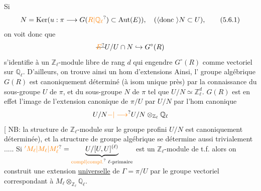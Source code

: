 Si
\[
N=\operatorname{Ker}(u:\pi\longrightarrow G(\unsure{R|\mathbb Q_\ell})\subset\operatorname{Aut}(E)),\quad(\inserted{\text{donc }}N\subset U),
\tag*{(5.6.1)}
\]
on voit donc que
\[
\deleted{\unsure{E}}U/U\cap N\hookrightarrow G^\circ(R)
\]
s'identifie à un $\mathbb Z_\ell$-module libre de rang $d$ qui engendre $G^\circ(R)$ comme vectoriel sur $\mathbb Q_\ell$. D'ailleurs, on trouve ainsi un hom d'extensions
Ainsi, l' groupe algébrique $G(R)$ est  canoniquement déterminé (à isom unique près) par la connaissance du sous-groupe  $U$ de $\pi$, et du sous-groupe  $N$ de $\pi$ tel que $U/N\simeq\mathbb Z_\ell^d$. $G(R)$ est en effet l'image de l'extension canonique de $\pi/U$ par $U/N$  par l'hom canonique
\[
U/N\unsure{-|\longrightarrow}U/N\otimes_{\mathbb Z_\ell}\mathbb Q_\ell
\]
[ NB: la structure de $\mathbb Z_\ell$-module sur le groupe profini $U/N$ est canoniquement déterminée), et la structure de groupe algébrique se détermine aussi trivialement .....
Si $\unsure{{}'M_\ell|M_\ell|M'_\ell}=\underbrace{U/[U,U]^{(\ell)}}_{\text{\unsure{compl|compl.} $\ell$-primaire}}$ est un $\mathbb Z_\ell$-module de t.f. alors on construit une extension \uline{universelle} de $\Gamma=\pi/U$ par le groupe vectoriel correspondant à $M_\ell\otimes_{\mathbb Z_\ell}\mathbb Q_\ell$.

